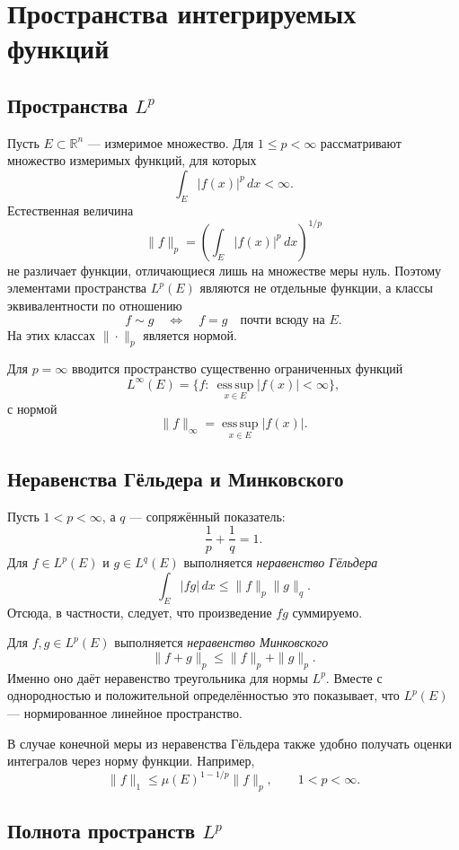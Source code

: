 \section{Пространства интегрируемых функций}
\label{sec:integrable-function-spaces}

\subsection{Пространства $L^p$}

Пусть $E\subset\mathbb R^n$ --- измеримое множество. Для
$1\leq p<\infty$ рассматривают множество измеримых функций, для которых
\[
    \int_E |f(x)|^p\,dx<\infty.
\]
Естественная величина
\[
    \|f\|_p=
    \left(\int_E|f(x)|^p\,dx\right)^{1/p}
\]
не различает функции, отличающиеся лишь на множестве меры нуль. Поэтому
элементами пространства $L^p(E)$ являются не отдельные функции, а классы
эквивалентности по отношению
\[
    f\sim g\quad\Longleftrightarrow\quad f=g\quad\text{почти всюду на }E.
\]
На этих классах $\|\cdot\|_p$ является нормой.

Для $p=\infty$ вводится пространство существенно ограниченных функций
\[
    L^\infty(E)=\{f:\ \operatorname*{ess\,sup}_{x\in E}|f(x)|<\infty\},
\]
с нормой
\[
    \|f\|_\infty=\operatorname*{ess\,sup}_{x\in E}|f(x)|.
\]

\subsection{Неравенства Гёльдера и Минковского}

Пусть $1<p<\infty$, а $q$ --- сопряжённый показатель:
\[
    \frac1p+\frac1q=1.
\]
Для $f\in L^p(E)$ и $g\in L^q(E)$ выполняется \emph{неравенство Гёльдера}
\[
    \int_E|fg|\,dx
    \leq \|f\|_p\|g\|_q.
\]
Отсюда, в частности, следует, что произведение $fg$ суммируемо.

Для $f,g\in L^p(E)$ выполняется \emph{неравенство Минковского}
\[
    \|f+g\|_p\leq\|f\|_p+\|g\|_p.
\]
Именно оно даёт неравенство треугольника для нормы $L^p$. Вместе с
однородностью и положительной определённостью это показывает, что $L^p(E)$ ---
нормированное линейное пространство.

В случае конечной меры из неравенства Гёльдера также удобно получать оценки
интегралов через норму функции. Например,
\[
    \|f\|_1\leq \mu(E)^{1-1/p}\|f\|_p,
    \qquad 1<p<\infty.
\]

\subsection{Полнота пространств $L^p$}

